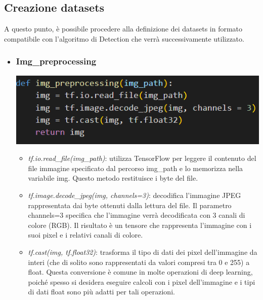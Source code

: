\documentclass{report}
\begin{document}
\subsection{Creazione datasets}
A questo punto, è possibile procedere alla definizione dei datasets in formato compatibile con l'algoritmo di Detection che verrà successivamente utilizzato.
\begin{itemize}
\item
\subsubsection{Img\_preprocessing}
\includegraphics[height=%
0.1\textheight]{pp}\\
\begin{itemize}
\item {\itshape tf.io.read\_file(img\_path)}: utilizza TensorFlow per leggere il contenuto del file immagine specificato dal percorso img\_path e lo memorizza nella variabile img. Questo metodo restituisce i byte del file.

\item {\itshape tf.image.decode\_jpeg(img, channels=3)}: decodifica l'immagine JPEG rappresentata dai byte ottenuti dalla lettura del file. Il parametro channels=3 specifica che l'immagine verrà decodificata con 3 canali di colore (RGB). Il risultato è un tensore che rappresenta l'immagine con i suoi pixel e i relativi canali di colore.

\item {\itshape tf.cast(img, tf.float32)}: trasforma il tipo di dati dei pixel dell'immagine da interi (che di solito sono rappresentati da valori compresi tra 0 e 255) a float. Questa conversione è comune in molte operazioni di deep learning, poiché spesso si desidera eseguire calcoli con i pixel dell'immagine e i tipi di dati float sono più adatti per tali operazioni.

\end{itemize}
\end{itemize}
\end{document}
